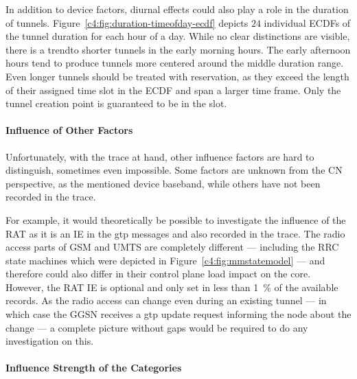 In addition to device factors, diurnal effects could also play a role in the duration of tunnels. Figure~\ref{c4:fig:duration-timeofday-ecdf} depicts $24$ individual \glspl{ECDF} of the tunnel duration for each hour of a day. While no clear distinctions are visible, there is a trendto shorter tunnels in the early morning hours. The early afternoon hours tend to produce tunnels more centered around the middle duration range. Even longer tunnels should be treated with reservation, as they exceed the length of their assigned time slot in the \gls{ECDF} and span a larger time frame. Only the tunnel creation point is guaranteed to be in the slot.


\paragraph{Influence of Other Factors}

Unfortunately, with the trace at hand, other influence factors are hard to distinguish, sometimes even impossible. Some factors are unknown from the \gls{CN} perspective, as the mentioned device baseband, while others have not been recorded in the trace.

For example, it would theoretically be possible to investigate the influence of the \gls{RAT} as it is an \gls{IE} in the \gls{gtp} messages and also recorded in the trace. The radio access parts of \gls{GSM} and \gls{UMTS} are completely different --- including the \gls{RRC} state machines which were depicted in Figure~\ref{c4:fig:mmstatemodel} --- and therefore could also differ in their control plane load impact on the core. However, the \gls{RAT} \gls{IE} is optional and only set in less than \SI{1}{\percent} of the available records. As the radio access can change even during an existing tunnel --- in which case the \gls{GGSN} receives a \gls{gtp} update request informing the node about the change --- a complete picture without gaps would be required to do any investigation on this.


\paragraph{Influence Strength of the Categories}

